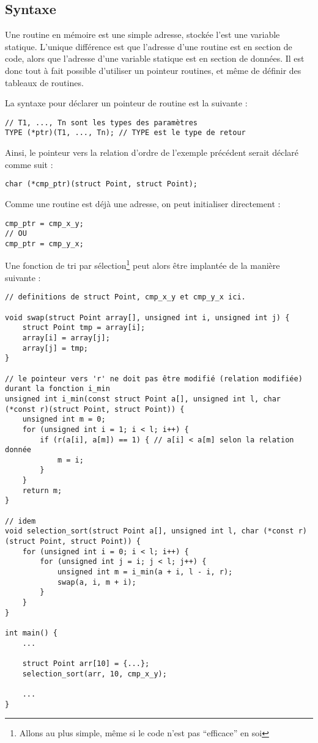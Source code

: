 \documentclass[../../../main.tex]{subfiles}
\begin{document}
\subsection{Syntaxe}
\label{sub:syntaxe_pointeurs_routines}
Une routine en mémoire est une simple adresse, stockée l'est une variable statique. L'unique différence est que l'adresse d'une routine est en section de code, alors que l'adresse d'une variable statique est en section de données. Il est donc tout à fait possible d'utiliser un pointeur routines, et même de définir des tableaux de routines.

La syntaxe pour déclarer un pointeur de routine est la suivante :
\begin{verbatim}
// T1, ..., Tn sont les types des paramètres
TYPE (*ptr)(T1, ..., Tn); // TYPE est le type de retour
\end{verbatim}
Ainsi, le pointeur vers la relation d'ordre de l'exemple précédent serait déclaré comme suit :
\begin{verbatim}
char (*cmp_ptr)(struct Point, struct Point);
\end{verbatim}
Comme une routine est déjà une adresse, on peut initialiser directement :
\begin{verbatim}
cmp_ptr = cmp_x_y;
// OU
cmp_ptr = cmp_y_x;
\end{verbatim}
Une fonction de tri par sélection\footnote{Allons au plus simple, même si le code n'est pas ``efficace'' en soi} peut alors être implantée de la manière suivante :
\begin{verbatim}
// definitions de struct Point, cmp_x_y et cmp_y_x ici.

void swap(struct Point array[], unsigned int i, unsigned int j) {
	struct Point tmp = array[i];
	array[i] = array[j];
	array[j] = tmp;
}

// le pointeur vers 'r' ne doit pas être modifié (relation modifiée) durant la fonction i_min
unsigned int i_min(const struct Point a[], unsigned int l, char (*const r)(struct Point, struct Point)) {
	unsigned int m = 0;
	for (unsigned int i = 1; i < l; i++) {
		if (r(a[i], a[m]) == 1) { // a[i] < a[m] selon la relation donnée
			m = i;
		}
	}
	return m;
}

// idem
void selection_sort(struct Point a[], unsigned int l, char (*const r)(struct Point, struct Point)) {
	for (unsigned int i = 0; i < l; i++) {
		for (unsigned int j = i; j < l; j++) {
			unsigned int m = i_min(a + i, l - i, r);
			swap(a, i, m + i);
		}
	}
}

int main() {
	...

	struct Point arr[10] = {...};
	selection_sort(arr, 10, cmp_x_y);

	...
}
\end{verbatim}
\end{document}
